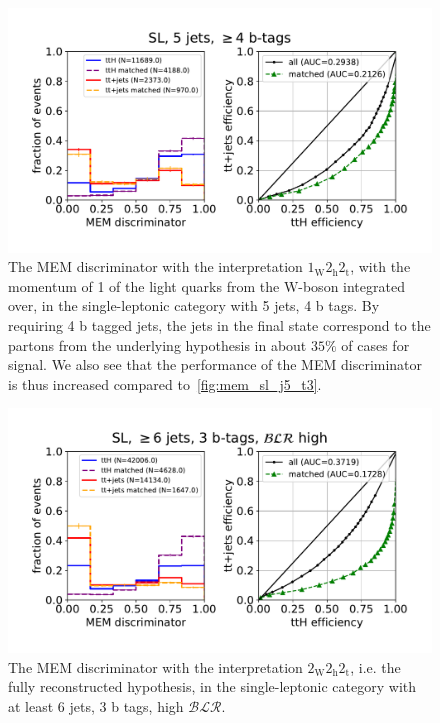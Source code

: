\begin{figure}
\begin{centering}
\includegraphics[width = 1.0\textwidth]{figures/mem_sl_j5_tge4.pdf}
\caption{The MEM discriminator with the interpretation $1_{\mathrm{W}} 2_{\mathrm{h}} 2_{\mathrm{t}}$, with the momentum of 1 of the light quarks from the $\mathrm{W}$-boson integrated over, in the single-leptonic category with 5 jets, 4 b tags. By requiring 4 b tagged jets, the jets in the final state correspond to the partons from the underlying hypothesis in about $35\%$ of cases for signal. We also see that the performance of the MEM discriminator is thus increased compared to~\cref{fig:mem_sl_j5_t3}.}
\label{fig:mem_sl_j5_t4}
\end{centering}
\end{figure}

\begin{figure}
\begin{centering}
\includegraphics[width = 1.0\textwidth]{figures/mem_sl_jge6_t3_blrH.pdf}
\caption{The MEM discriminator with the interpretation $2_{\mathrm{W}} 2_{\mathrm{h}} 2_{\mathrm{t}}$, i.e. the fully reconstructed hypothesis, in the single-leptonic category with at least 6 jets, 3 b tags, high $\mathcal{BLR}$.}
\label{fig:mem_sl_jge6_t3}
\end{centering}
\end{figure}

